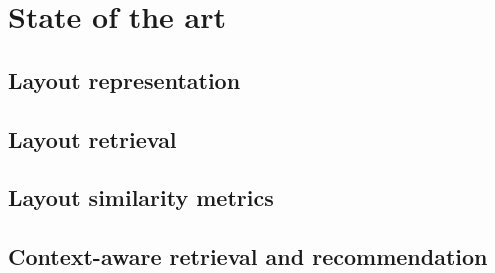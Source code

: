 \section{State of the art}


\subsection*{Layout representation}

\subsection*{Layout retrieval}

\subsection*{Layout similarity metrics}


\subsection*{Context-aware retrieval and recommendation}






